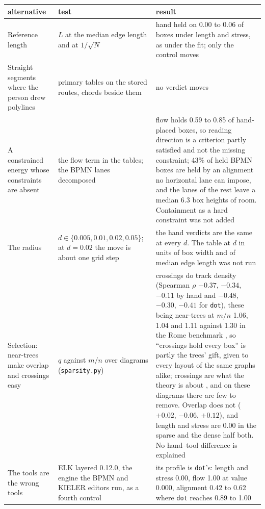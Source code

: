 \documentclass[a4paper,UKenglish]{gd-lipics-v3}
\begin{document}
\begin{center}\small
\begin{tabular}{@{}p{2.2cm}p{3.7cm}p{7.0cm}@{}}
\toprule
alternative & test & result \\
\midrule
Reference length
 & $L$ at the median edge length and at $1/\sqrt{N}$
 & hand held on 0.00 to 0.06 of boxes under length and stress, as under the fit; only the
   control moves \\[2pt]
Straight segments where the person drew polylines
 & primary tables on the stored routes, chords beside them
 & no verdict moves \\[2pt]
A constrained energy whose constraints are absent
 & the flow term in the tables; the BPMN lanes decomposed
 & flow holds 0.59 to 0.85 of hand-placed boxes, so reading direction is a criterion partly
   satisfied and not the missing constraint; 43\% of held BPMN boxes are held by an
   alignment no horizontal lane can impose, and the lanes of the rest leave a median 6.3
   box heights of room. Containment as a hard constraint was not added \\[2pt]
The radius
 & $d \in \{0.005, 0.01, 0.02, 0.05\}$; at $d=0.02$ the move is about one grid step
 & the hand verdicts are the same at every $d$. The table at $d$ in units of box width and
   of median edge length was not run \\[2pt]
Selection: near-trees make overlap and crossings easy
 & $q$ against $m/n$ over diagrams (\texttt{sparsity.py})
 & crossings do track density (Spearman $\rho$ $-0.37$, $-0.34$, $-0.11$ by hand and
   $-0.48$, $-0.30$, $-0.41$ for \texttt{dot}), these being near-trees at $m/n$ 1.06, 1.04
   and 1.11 against 1.30 in the Rome benchmark \cite{rome}, so ``crossings hold every box''
   is partly the trees' gift, given to every layout of the same graphs alike; crossings are
   what the theory is about \cite{gj83}, and on these diagrams there are few to remove. Overlap does
   not ($+0.02$, $-0.06$, $+0.12$), and length and stress are 0.00 in the sparse and the
   dense half both. No hand--tool difference is explained \\[2pt]
The tools are the wrong tools
 & ELK layered 0.12.0, the engine the BPMN and KIELER editors run, as a fourth control
 & its profile is \texttt{dot}'s: length and stress 0.00, flow 1.00 at value 0.000,
   alignment 0.42 to 0.62 where \texttt{dot} reaches 0.89 to 1.00 \\
\bottomrule
\end{tabular}
\end{center}
\end{document}
